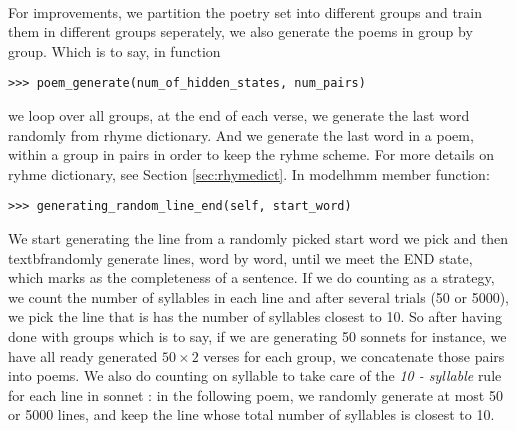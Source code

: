 \paragraph{}
For improvements, we partition the poetry set into different groups and train them in different groups seperately, we also generate the poems in group by group. Which is to say, in function
\begin{lstlisting}
>>> poem_generate(num_of_hidden_states, num_pairs)
\end{lstlisting}
we loop over all groups, at the end of each verse, we generate the last word randomly from rhyme dictionary. And we generate the last word in a poem, within a group in pairs in order to keep the ryhme scheme. For more details on ryhme dictionary, see Section \ref{sec:rhymedict}. In modelhmm member function:
\begin{lstlisting}
>>> generating_random_line_end(self, start_word)
\end{lstlisting}
We start generating the line from a randomly picked start word we pick and then \\textbf{randomly} generate lines, word by word, until we meet the END state, which marks as the completeness of a sentence. If we do counting as a strategy, we count the number of syllables in each line and after several trials (50 or 5000), we pick the line that is has the number of syllables closest to 10. So after having done with groups which is to say, if we are generating 50 sonnets for instance, we have all ready generated $50 \times 2$ verses for each group, we concatenate those pairs into poems. We also do counting on syllable to take care of the \textit{10 - syllable} rule for
each line in sonnet : in the following poem, we randomly generate at most 50 or 5000 lines, and keep the line whose total number of syllables is closest to 10.

